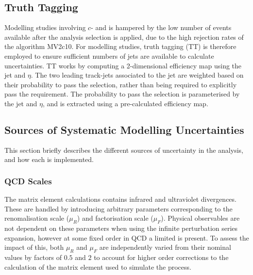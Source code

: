 \subsection{Truth Tagging}\label{sec:truth_tagging}

Modelling studies involving $c$- and \ljets is hampered by the low number of events available after the analysis selection is applied, due to the high rejection rates of the \btagging algorithm MV2c10.
For modelling studies, truth tagging (TT) is therefore employed to ensure sufficient numbers of jets are available to calculate uncertainties.
TT works by computing a 2-dimensional efficiency map using the jet \pt and $\eta$.
The two leading track-jets associated to the \largeR jet are weighted based on their probability to pass the \btagging selection, rather than being required to explicitly pass the \btagging requirement.
The probability to pass the \btagging selection is parameterised by the jet \pt and $\eta$, and is extracted using a pre-calculated efficiency map.

\subsection{Sources of Systematic Modelling Uncertainties}\label{sec:sources_of_uncertainties}

This section briefly describes the different sources of uncertainty in the analysis, and how each is implemented.

\subsubsection{QCD Scales}

The \Vjets matrix element calculations contains infrared and ultraviolet divergences.
These are handled by introducing arbitrary parameters corresponding to the renomalisation scale ($\mu_R$) and factorisation scale ($\mu_F$).
Physical observables are not dependent on these parameters when using the infinite perturbation series expansion, however at some fixed order in QCD a limited is present.
To assess the impact of this, both $\mu_R$ and $\mu_F$ are independently varied from their nominal values by factors of $0.5$ and $2$ to account for higher order corrections to the calculation of the matrix element used to simulate the process.


